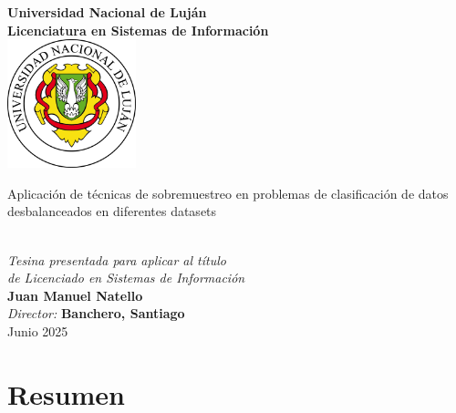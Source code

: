 \documentclass[12pt,a4paper]{article}
\begin{document}
\thispagestyle{empty}
\begin{center}
    \vspace*{1cm}

    {\Huge \textbf{Universidad Nacional de Luján}}\\[0.25em]
    {\LARGE \textbf{Licenciatura en Sistemas de Información}}\\[4em]

    \includegraphics[width=0.28\textwidth]{imgs/logo_unlu.png}\\[4em]

    \begin{minipage}{0.9\textwidth}
        \centering
        {\Large Aplicación de técnicas de sobremuestreo en problemas de clasificación de datos desbalanceados en diferentes datasets}
    \end{minipage}\\[3em]

    {\itshape Tesina presentada para aplicar al título}\\
    {\itshape de Licenciado en Sistemas de Información}\\[2em]

    {\Large \textbf{Juan Manuel Natello}}\\[6em]

    {\large \textit{Director:} \textbf{Banchero, Santiago}}\\[6em]

    {\Large Junio 2025}
\end{center}

\newpage
{}
\tableofcontents

\newpage
{}

\section{Resumen}
\end{document}

